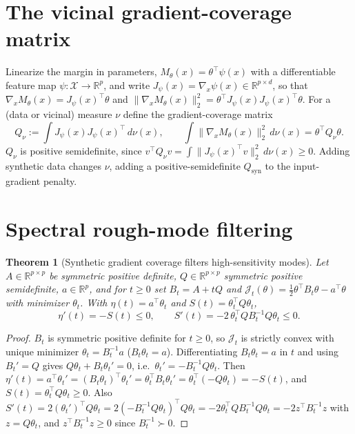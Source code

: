 \documentclass[11pt]{article}
\newtheorem{theorem}{Theorem}
\theoremstyle{definition}
\newcommand{\R}{\mathbb{R}}
\begin{document}
\section{The vicinal gradient-coverage matrix}
Linearize the margin in parameters, $M_\theta(x)=\theta^\top\psi(x)$ with a differentiable feature map
$\psi:\mathcal X\to\R^p$, and write $J_\psi(x)=\nabla_x\psi(x)\in\R^{p\times d}$, so that
$\nabla_xM_\theta(x)=J_\psi(x)^\top\theta$ and $\|\nabla_xM_\theta(x)\|_2^2=\theta^\top J_\psi(x)J_\psi(x)^\top\theta$.
For a (data or vicinal) measure $\nu$ define the gradient-coverage matrix
\[
Q_\nu:=\int J_\psi(x)J_\psi(x)^\top\,d\nu(x),\qquad
\int\|\nabla_xM_\theta(x)\|_2^2\,d\nu(x)=\theta^\top Q_\nu\theta .
\]
$Q_\nu$ is positive semidefinite, since $v^\top Q_\nu v=\int\|J_\psi(x)^\top v\|_2^2\,d\nu(x)\ge0$. Adding
synthetic data changes $\nu$, adding a positive-semidefinite $Q_{\mathrm{syn}}$ to the input-gradient penalty.

\section{Spectral rough-mode filtering}
\begin{theorem}[Synthetic gradient coverage filters high-sensitivity modes]\label{thm:synthetic-filter}
Let $A\in\R^{p\times p}$ be symmetric positive definite, $Q\in\R^{p\times p}$ symmetric positive
semidefinite, $a\in\R^p$, and for $t\ge0$ set $B_t=A+tQ$ and
$\mathcal J_t(\theta)=\tfrac12\theta^\top B_t\theta-a^\top\theta$ with minimizer $\theta_t$. With
$\eta(t)=a^\top\theta_t$ and $S(t)=\theta_t^\top Q\theta_t$,
\[
\eta'(t)=-S(t)\le0,\qquad S'(t)=-2\,\theta_t^\top Q B_t^{-1}Q\theta_t\le0 .
\]
\end{theorem}
\begin{proof}
$B_t$ is symmetric positive definite for $t\ge0$, so $\mathcal J_t$ is strictly convex with unique minimizer
$\theta_t=B_t^{-1}a$ ($B_t\theta_t=a$). Differentiating $B_t\theta_t=a$ in $t$ and using $B_t'=Q$ gives
$Q\theta_t+B_t\theta_t'=0$, i.e.\ $\theta_t'=-B_t^{-1}Q\theta_t$. Then
$\eta'(t)=a^\top\theta_t'=(B_t\theta_t)^\top\theta_t'=\theta_t^\top B_t\theta_t'=\theta_t^\top(-Q\theta_t)=-S(t)$,
and $S(t)=\theta_t^\top Q\theta_t\ge0$. Also
$S'(t)=2(\theta_t')^\top Q\theta_t=2(-B_t^{-1}Q\theta_t)^\top Q\theta_t=-2\theta_t^\top QB_t^{-1}Q\theta_t=-2z^\top B_t^{-1}z$
with $z=Q\theta_t$, and $z^\top B_t^{-1}z\ge0$ since $B_t^{-1}\succ0$.
\end{proof}
\end{document}
